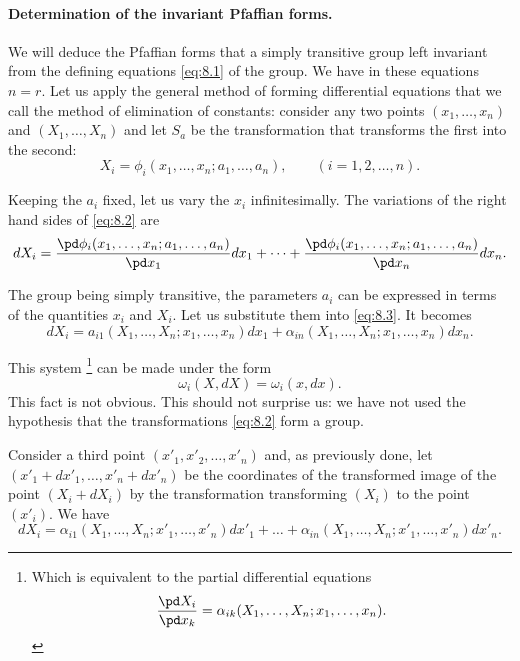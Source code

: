 \paragraph{Determination of the invariant Pfaffian forms.}
\label{sec:107}
We will deduce the Pfaffian forms that a simply transitive group left invariant from the defining equations \eqref{eq:8.1} of the group. We have in these equations $n=r$. Let us apply the general method of forming differential equations that we call the method of elimination of constants: consider any two points $(x_{1},\dots,x_{n})$ and $(X_{1},\dots,X_{n})$ and let $S_{a}$ be the transformation that transforms the first into the second:
\begin{equation}
  \label{eq:8.2}
  X_{i}=\phi_{i}(x_{1},\dots,x_{n};a_{1},\dots,a_{n}),\qquad(i=1,2,\dots,n).
\end{equation}

Keeping the $a_{i}$ fixed, let us vary the $x_{i}$ infinitesimally. The variations of the right hand sides of \eqref{eq:8.2} are
\begin{equation}
  \label{eq:8.3}
  dX_{i}=\frac{\pd\phi_{i}(x_{1},\dots,x_{n};a_{1},\dots,a_{n})}{\pd x_{1}}dx_{1}+\dots+\frac{\pd \phi_{i}(x_{1},\dots,x_{n};a_{1},\dots,a_{n})}{\pd x_{n}}dx_{n}.
\end{equation}

The group being simply transitive, the parameters $a_{i}$ can be expressed in terms of the quantities $x_{i}$ and $X_{i}$. Let us substitute them into \eqref{eq:8.3}. It becomes
\begin{equation}
  \label{eq:8.4}
  dX_{i}=a_{i1}(X_{1},\dots,X_{n};x_{1},\dots,x_{n})dx_{1}+\alpha_{in}(X_{1},\dots,X_{n};x_{1},\dots,x_{n})dx_{n}.
\end{equation}

This system \footnote{Which is equivalent to the partial differential equations
\[
\frac{\pd X_{i}}{\pd x_{k}}=\alpha_{ik}(X_{1},\dots,X_{n};x_{1},\dots,x_{n}).
\]}
can be made under the form
\[
\omega_{i}(X,dX)=\omega_{i}(x,dx).
\]
This fact is not obvious. This should not surprise us: we have not used the hypothesis that the transformations \eqref{eq:8.2} form a group.

Consider a third point $(x'_{1},x'_{2},\dots,x'_{n})$ and, as previously done, let $(x'_{1}+dx'_{1},\dots,x'_{n}+dx'_{n})$ be the coordinates of the transformed image of the point $(X_{i}+dX_{i})$ by the transformation transforming $(X_{i})$ to the point $(x'_{i})$. We have
\begin{equation}
  \label{eq:8.5}
  dX_{i}=\alpha_{i1}(X_{1},\dots,X_{n};x'_{1},\dots,x'_{n})dx'_{1}+\dots+\alpha_{in}(X_{1},\dots,X_{n};x'_{1},\dots,x'_{n})dx'_{n}.
\end{equation}

